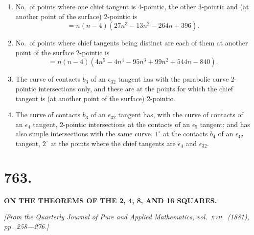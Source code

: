 \documentclass[11pt,a4paper]{book}
\begin{document}
\begin{enumerate}[label=\arabic*., start=25]
\item No.\ of points where one chief tangent is 4-pointic, the other 3-pointic and (at another point of the surface) 2-pointic is
\[= n(n-4)(27n^3 - 13n^2 - 264n + 396).\]

\item No.\ of points where chief tangents being distinct are each of them at another point of the surface 2-pointic is
\[= n(n-4)(4n^5 - 4n^4 - 95n^3 + 99n^2 + 544n - 840).\]

\item The curve of contacts $b_3$ of an $\epsilon_{32}$ tangent has with the parabolic curve 2-pointic intersections only, and these are at the points for which the chief tangent is (at another point of the surface) 2-pointic.

\item The curve of contacts $b_3$ of an $\epsilon_{32}$ tangent has, with the curve of contacts of an $\epsilon_4$ tangent, 2-pointic intersections at the contacts of an $\epsilon_5$ tangent; and has also simple intersections with the same curve, $1^{\circ}$ at the contacts $b_4$ of an $\epsilon_{42}$ tangent, $2^{\circ}$ at the points where the chief tangents are $\epsilon_4$ and $\epsilon_{32}$.
\end{enumerate}

\newpage

\section*{763.}

\begin{center}
\textbf{ON THE THEOREMS OF THE 2, 4, 8, AND 16 SQUARES.}
\end{center}

\noindent\textit{[From the \textit{Quarterly Journal of Pure and Applied Mathematics}, vol.\ \textsc{xvii}.\ (1881), pp.\ 258---276.]}

\vspace{\baselineskip}
\end{document}
